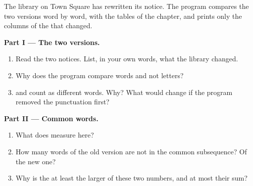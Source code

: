 \begin{problem}\label{pb:g12:dynamic-programming:1}
The library on Town Square has rewritten its notice. The program compares the two versions word by word, with the
tables of the chapter, and prints only the columns of the  that changed.

\label{lst:g12:dynamic-programming:versions}

\label{out:g12:dynamic-programming:versions}

\medskip\noindent\textbf{Part I --- The two versions.}
\begin{enumerate}
  \item Read the two notices. List, in your own words, what the library changed.
  \item Why does the program compare words and not letters?
  \item {} and  count as different words. Why? What would change if the program removed the
    punctuation first?
\end{enumerate}

\medskip\noindent\textbf{Part II --- Common words.}
\begin{enumerate}[resume]
  \item What does  measure here?
  \item How many words of the old version are not in the common subsequence? Of the new one?
  \item Why is the  at least the larger of these two numbers, and at most their sum?
\end{enumerate}


\end{problem}
